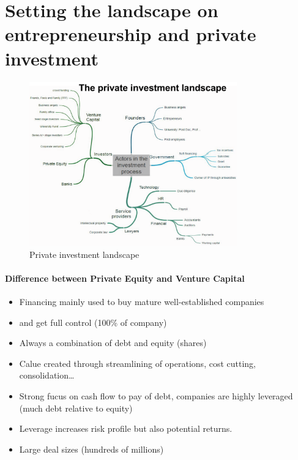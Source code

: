 \section{Setting the landscape on entrepreneurship and private investment}

\begin{figure}[h]
    \centering
    \includegraphics[width=0.8\textwidth]{Pictures/private_investment_landscape.png}
    \caption{Private investment landscape}
    \label{private_investment_landscape}
\end{figure}


\paragraph{Difference between Private Equity and Venture Capital}

\begin{definition}
    \begin{itemize}
        \item Financing mainly used to buy mature well-established companies
        \item and get full control (100\% of company)
        \item Always a combination of debt and equity (shares)
        \item Calue created through streamlining of operations, cost cutting, consolidation\dots
        \item Strong fucus on cash flow to pay of debt, companies are highly leveraged (much debt relative to equity)
        \item Leverage increases risk profile but also potential returns.
        \item Large deal sizes (hundreds of millions)
    \end{itemize}
\end{definition}


